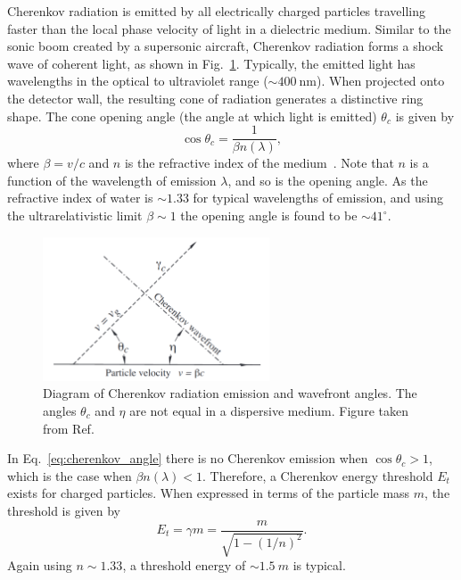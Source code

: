 Cherenkov radiation is emitted by all electrically charged particles travelling faster than the
local phase velocity of light in a dielectric medium. Similar to the sonic boom created by a
supersonic aircraft, Cherenkov radiation forms a shock wave of coherent light, as shown in
Fig.~\ref{fig:cherenkov}. Typically, the emitted light has wavelengths in the optical to
ultraviolet range ($\sim400~\text{nm}$). When projected onto the detector wall, the resulting cone
of radiation generates a distinctive ring shape. The cone opening angle (the angle at which light
is emitted) $\theta_{c}$ is given by
\begin{equation}
    \cos\theta_{c} = \frac{1}{\beta n(\lambda)},
    \label{eq:cherenkov_angle}
\end{equation}
where $\beta=v/c$ and $n$ is the refractive index of the medium~\cite{particle2020}. Note that $n$
is a function of the wavelength of emission $\lambda$, and so is the opening angle. As the
refractive index of water is $\sim 1.33$ for typical wavelengths of emission, and using the
ultrarelativistic limit $\beta\sim 1$ the opening angle is found to be $\sim41^{\circ}$.

\begin{figure} %
    \includegraphics[width=0.6\textwidth]{diagrams/4-chips/cherenkov.pdf}
    \caption[Diagram of Cherenkov radiation emission]
    {Diagram of Cherenkov radiation emission and wavefront angles. The angles $\theta_{c}$ and
        $\eta$ are not equal in a dispersive medium. Figure taken from Ref.~\cite{particle2020}}
    \label{fig:cherenkov}
\end{figure}

In Eq.~\ref{eq:cherenkov_angle} there is no Cherenkov emission when $\cos\theta_{c} > 1$, which is
the case when $\beta n(\lambda)<1$. Therefore, a Cherenkov energy threshold $E_{t}$ exists for
charged particles. When expressed in terms of the particle mass $m$, the threshold is given by
\begin{equation}
    E_{t} = \gamma m = \frac{m}{\sqrt{1-(1/n)^{2}}}.
    \label{eq:cherenkov_threshold}
\end{equation}
Again using $n\sim 1.33$, a threshold energy of $\sim1.5~m$ is typical.

